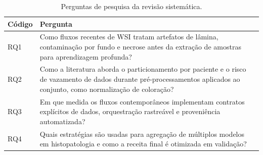 \begin{table}[!htb]
\centering
\caption{Perguntas de pesquisa da revisão sistemática.}
\label{tab:revisao_sistematica_perguntas}
\small
\begin{tabular}{>{\raggedright\arraybackslash}p{2.0cm}>{\raggedright\arraybackslash}p{11.1cm}}
\toprule
Código & Pergunta \\
\midrule
RQ1 & Como fluxos recentes de WSI tratam artefatos de lâmina, contaminação por fundo e necrose antes da extração de amostras para aprendizagem profunda? \\
RQ2 & Como a literatura aborda o particionamento por paciente e o risco de vazamento de dados durante pré-processamentos aplicados ao conjunto, como normalização de coloração? \\
RQ3 & Em que medida os fluxos contemporâneos implementam contratos explícitos de dados, orquestração rastreável e proveniência automatizada? \\
RQ4 & Quais estratégias são usadas para agregação de múltiplos modelos em histopatologia e como a receita final é otimizada em validação? \\
\bottomrule
\end{tabular}
\normalsize
\end{table}

